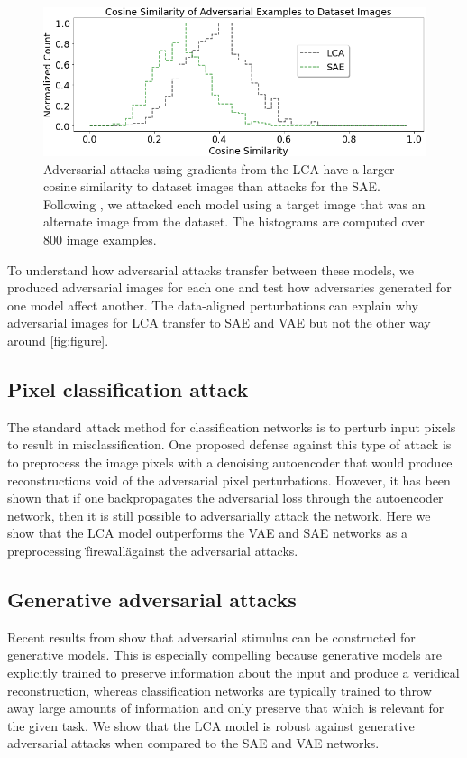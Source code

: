 \begin{figure}[h]\label{fig:cosine_similarity}
\begin{center}
\centerline{\includegraphics[width=\columnwidth]{Figures/cosyne_similarity.png}}
\end{center}
\caption{Adversarial attacks using gradients from the LCA have a larger cosine similarity to dataset images than attacks for the SAE. Following \cite{kos2018adversarial}, we attacked each model using a target image that was an alternate image from the dataset. The histograms are computed over 800 image examples.}
\end{figure}

To understand how adversarial attacks transfer between these models, we produced adversarial images for each one and test how adversaries generated for one model affect another. The data-aligned perturbations can explain why adversarial images for LCA transfer to SAE and VAE but not the other way around \ref{fig:figure}.

\subsection{Pixel classification attack}
The standard attack method for classification networks is to perturb input pixels to result in misclassification. One proposed defense against this type of attack is to preprocess the image pixels with a denoising autoencoder that would produce reconstructions void of the adversarial pixel perturbations. However, it has been shown that if one backpropagates the adversarial loss through the autoencoder network, then it is still possible to adversarially attack the network. Here we show that the LCA model outperforms the VAE and SAE networks as a preprocessing \"firewall\" against the adversarial attacks.

\subsection{Generative adversarial attacks}
Recent results from \citet{kos2018adversarial} show that adversarial stimulus can be constructed for generative models. This is especially compelling because generative models are explicitly trained to preserve information about the input and produce a veridical reconstruction, whereas classification networks are typically trained to throw away large amounts of information and only preserve that which is relevant for the given task. We show that the LCA model is robust against generative adversarial attacks when compared to the SAE and VAE networks.

